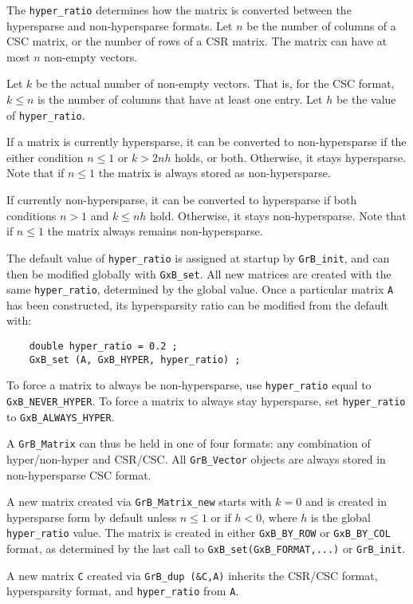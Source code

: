 \documentclass[12pt]{article}
\begin{document}
The \verb'hyper_ratio' determines how the matrix is converted between the
hypersparse and non-hypersparse formats.  Let $n$ be the number of columns of a
CSC matrix, or the number of rows of a CSR matrix.  The matrix can have at most
$n$ non-empty vectors.

Let $k$ be the actual number of non-empty vectors.  That is, for the CSC
format, $k \le n$ is the number of columns that have at least one entry.  Let
$h$ be the value of \verb'hyper_ratio'.

If a matrix is currently hypersparse, it can be converted to non-hypersparse if
the either condition $n \le 1$ or $k > 2nh$ holds, or both.  Otherwise, it
stays hypersparse.  Note that if $n \le 1$ the matrix is always stored as
non-hypersparse.

If currently non-hypersparse, it can be converted to hypersparse if
both conditions $n > 1$ and $k \le nh$ hold.  Otherwise, it stays
non-hypersparse.  Note that if $n \le 1$ the matrix always remains
non-hypersparse.

The default value of \verb'hyper_ratio' is assigned at startup by
\verb'GrB_init', and can then be modified globally with \verb'GxB_set'.  All
new matrices are created with the same \verb'hyper_ratio', determined by the
global value.  Once a particular matrix \verb'A' has been constructed, its
hypersparsity ratio can be modified from the default with:

    {\footnotesize
    \begin{verbatim}
    double hyper_ratio = 0.2 ;
    GxB_set (A, GxB_HYPER, hyper_ratio) ; \end{verbatim}}

To force a matrix to always be non-hypersparse, use \verb'hyper_ratio' equal to
\verb'GxB_NEVER_HYPER'.  To force a matrix to always stay hypersparse, set
\verb'hyper_ratio' to \verb'GxB_ALWAYS_HYPER'.

A \verb'GrB_Matrix' can thus be held in one of four formats: any combination of
hyper/non-hyper and CSR/CSC.  All \verb'GrB_Vector' objects are always stored
in non-hypersparse CSC format.

A new matrix created via \verb'GrB_Matrix_new' starts with $k=0$ and is created
in hypersparse form by default unless $n \le 1$ or if $h<0$, where $h$ is the
global \verb'hyper_ratio' value.  The matrix is created in either
\verb'GxB_BY_ROW' or \verb'GxB_BY_COL' format, as determined by the last call
to \verb'GxB_set(GxB_FORMAT,...)' or \verb'GrB_init'.

A new matrix \verb'C' created via \verb'GrB_dup (&C,A)' inherits the CSR/CSC
format, hypersparsity format, and \verb'hyper_ratio' from \verb'A'.
\end{document}

